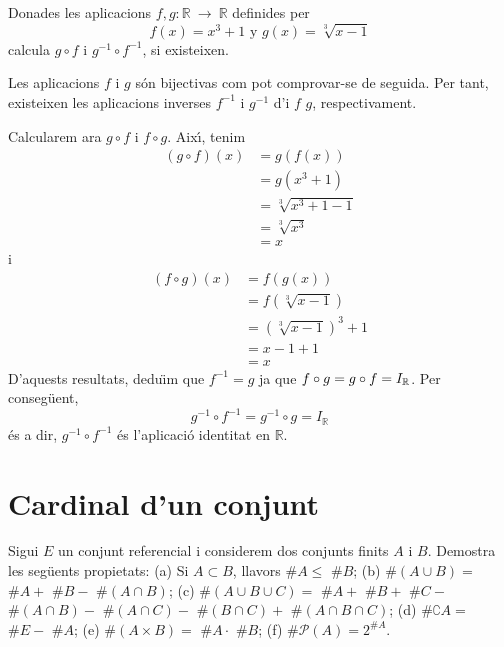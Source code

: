 \begin{exer}
Donades les aplicacions $f,g:\mathbb{R}~\longrightarrow ~\mathbb{R}$
definides per%
\begin{equation*}
f(x)=x^{3}+1\text{ \ \ \ \ y \ \ \ \ }g(x)=\sqrt[3]{x-1}
\end{equation*}%
calcula $g\circ f$ i $g^{-1}\circ f^{-1}$, si existeixen.
\end{exer}

\begin{solucio}
Les aplicacions $f$ i $g$ s\'{o}n bijectivas com pot comprovar-se de
seguida. Per tant, existeixen les aplicacions inverses $f^{-1}$ i $g^{-1}$
d'i $f$ $g$, respectivament.

Calcularem ara $g\circ f$ i $f\circ g$. Aix\'{\i}, tenim%
\begin{align*}
(g\circ f)(x)& =g\left( f(x)\right) \\
& =g(x^{3}+1) \\
& =\sqrt[3]{x^{3}+1-1} \\
& =\sqrt[3]{x^{3}} \\
& =x
\end{align*}%
i%
\begin{align*}
(f\circ g)(x)& =f\left( g(x)\right) \\
& =f\left( \sqrt[3]{x-1}\right) \\
& =\left( \sqrt[3]{x-1}\right) ^{3}+1 \\
& =x-1+1 \\
& =x
\end{align*}%
D'aquests resultats, dedu\"{\i}m que $f^{-1}=g$ ja que $f\circ g=g\circ f=I_{%
\mathbb{R}}$. Per conseg\"{u}ent,%
\begin{equation*}
g^{-1}\circ f^{-1}=g^{-1}\circ g=I_{\mathbb{R}}
\end{equation*}%
\'{e}s a dir, $g^{-1}\circ f^{-1}$ \'{e}s l'aplicaci\'{o} identitat en $%
\mathbb{R}$.
\end{solucio}

\section{Cardinal d'un conjunt}

\begin{exer}
Sigui $E$ un conjunt referencial i considerem dos conjunts finits $A$ i $B$.
Demostra les seg\"{u}ents propietats: (a) Si $A\subset B$, llavors $\#A\leq $
$\#B$; (b) $\#\left( A\cup B\right) =$ $\#A+$ $\#B-$ $\#\left( A\cap
B\right) $; (c) $\#\left( A\cup B\cup C\right) =$ $\#A+$ $\#B+$ $\#C-$ $%
\#\left( A\cap B\right) -$ $\#\left( A\cap C\right) -$ $\#\left( B\cap
C\right) +$ $\#\left( A\cap B\cap C\right) $; (d) $\#\complement A=$ $\#E-$ $%
\#A$; (e) $\#\left( A\times B\right) =$ $\#A\cdot $ $\#B$; (f) $\#\mathcal{P}%
(A)=2^{\#A}$.
\end{exer}

